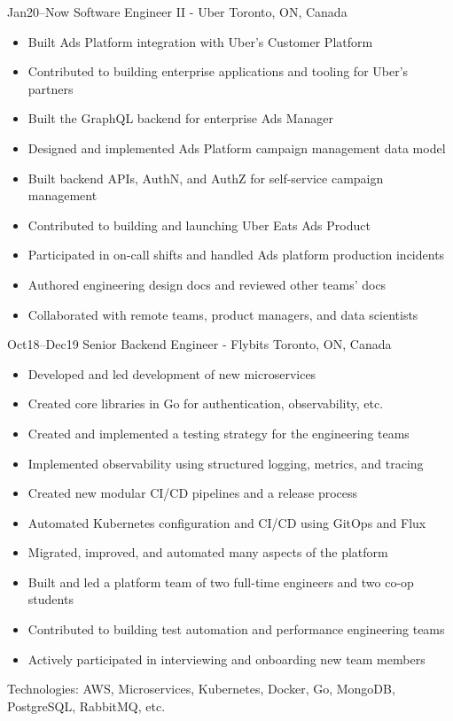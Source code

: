 \documentclass[]{cv-style}                     %
\begin{document}
\begin{entrylist}

  \entry
  {\small Jan20--Now}
  {Software Engineer II - Uber}
  {Toronto, ON, Canada}
  {
    \begin{itemize}
      \item Built Ads Platform integration with Uber's Customer Platform
      \item Contributed to building enterprise applications and tooling for Uber's partners
      \item Built the GraphQL backend for enterprise Ads Manager
      \item Designed and implemented Ads Platform campaign management data model
      \item Built backend APIs, AuthN, and AuthZ for self-service campaign management
      \item Contributed to building and launching Uber Eats Ads Product
      \item Participated in on-call shifts and handled Ads platform production incidents
      \item Authored engineering design docs and reviewed other teams' docs
      \item Collaborated with remote teams, product managers, and data scientists
    \end{itemize}
  }

  \entry
  {\small Oct18--Dec19}
  {Senior Backend Engineer - Flybits}
  {Toronto, ON, Canada}
  {
    \begin{itemize}
      \item Developed and led development of new microservices
      \item Created core libraries in Go for authentication, observability, etc.
      \item Created and implemented a testing strategy for the engineering teams
      \item Implemented observability using structured logging, metrics, and tracing
      \item Created new modular CI/CD pipelines and a release process
      \item Automated Kubernetes configuration and CI/CD using GitOps and Flux
      \item Migrated, improved, and automated many aspects of the platform
      \item Built and led a platform team of two full-time engineers and two co-op students
      \item Contributed to building test automation and performance engineering teams
      \item Actively participated in interviewing and onboarding new team members
    \end{itemize}
    Technologies: AWS, Microservices, Kubernetes, Docker, Go, MongoDB, PostgreSQL, RabbitMQ, etc.
  }


\end{entrylist}
\end{document}
